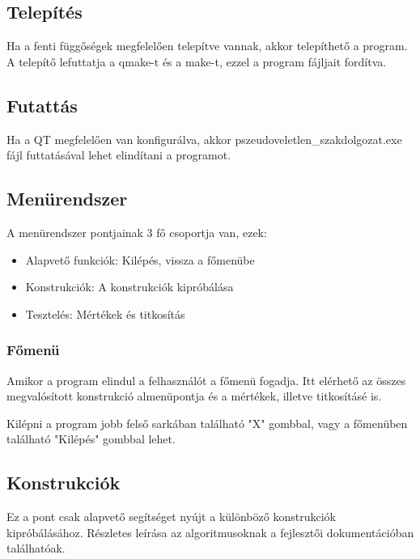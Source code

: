 \documentclass[12pt]{article}
\begin{document}
	\subsection{Telepítés}
	Ha a fenti függőségek megfelelően telepítve vannak, akkor telepíthető a program. A telepítő lefuttatja a qmake-t és a make-t, ezzel a program fájljait fordítva.
	\subsection{Futattás}
	Ha a QT megfelelően van konfigurálva, akkor pszeudoveletlen\_szakdolgozat.exe fájl futtatásával lehet elindítani a programot.
	\subsection{Menürendszer}
	A menürendszer pontjainak 3 fő csoportja van, ezek:
	\begin{itemize}
		\item Alapvető funkciók: Kilépés, vissza a főmenübe
		\item Konstrukciók: A konstrukciók kipróbálása
		\item Tesztelés: Mértékek és titkosítás
	\end{itemize}
	\subsubsection{Főmenü}
	Amikor a program elindul a felhasználót a főmenü fogadja. Itt elérhető az összes megvalósított konstrukció almenüpontja és a mértékek, illetve titkosításé is.
	
	Kilépni a program jobb felső sarkában található "X" gombbal, vagy a főmenüben található "Kilépés" gombbal lehet.
	\subsection*{Konstrukciók}
	Ez a pont csak alapvető segítséget nyújt a különböző konstrukciók kipróbálásához. Részletes leírása az algoritmusoknak a fejlesztői dokumentációban találhatóak.
	\par
\end{document}
